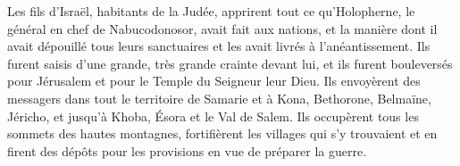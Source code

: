 Les fils d'Israël, habitants de la Judée,
	apprirent tout ce qu'Holopherne, le général en chef de Nabucodonosor,
		avait fait aux nations,
	et la manière dont il avait dépouillé tous leurs sanctuaires
		et les avait livrés à l'anéantissement.
Ils furent saisis d'une grande, très grande crainte devant lui,
	et ils furent bouleversés pour Jérusalem et pour le Temple du Seigneur leur Dieu.
Ils envoyèrent des messagers dans tout le territoire de Samarie
	et à Kona, Bethorone, Belmaïne, Jéricho, et jusqu'à Khoba, Ésora et le Val de Salem.
Ils occupèrent tous les sommets des hautes montagnes,
	fortifièrent les villages qui s'y trouvaient
	et en firent des dépôts pour les provisions en vue de préparer la guerre.
